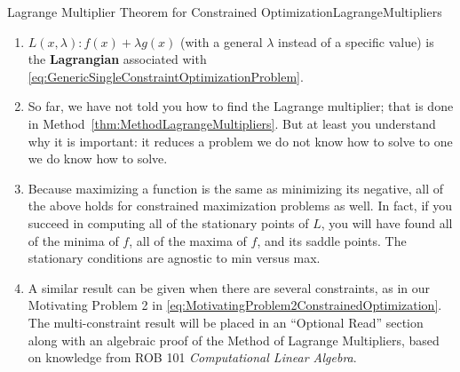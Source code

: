 \begin{propColor}{Lagrange Multiplier Theorem for Constrained Optimization}{LagrangeMultipliers}
\begin{rem}
\begin{enumerate}
\item $L(x, \lambda): f(x) + \lambda g(x)$ (with a general $\lambda$ instead of a specific value) is the \textbf{Lagrangian} associated with \eqref{eq:GenericSingleConstraintOptimizationProblem}.

\item So far, we have not told you how to find the Lagrange multiplier; that is done in Method~\ref{thm:MethodLagrangeMultipliers}. But at least you understand why it is important: it reduces a problem we do not know how to solve to one we do know how to solve.

\item Because maximizing a function is the same as minimizing its negative, all of the above holds for constrained maximization problems as well. In fact, if you succeed in computing all of the stationary points of $L$, you will have found all of the minima of $f$, all of the maxima of $f$, and its saddle points. The stationary conditions are agnostic to min versus max. 

\item A similar result can be given when there are several constraints, as in our Motivating Problem 2 in \eqref{eq:MotivatingProblem2ConstrainedOptimization}. The multi-constraint result will be placed in an ``Optional Read'' section along with an algebraic proof of the Method of Lagrange Multipliers, based on knowledge from ROB 101 \textit{Computational Linear Algebra}. 
\end{enumerate}
    
\end{rem}    
\end{propColor}

\bigskip

